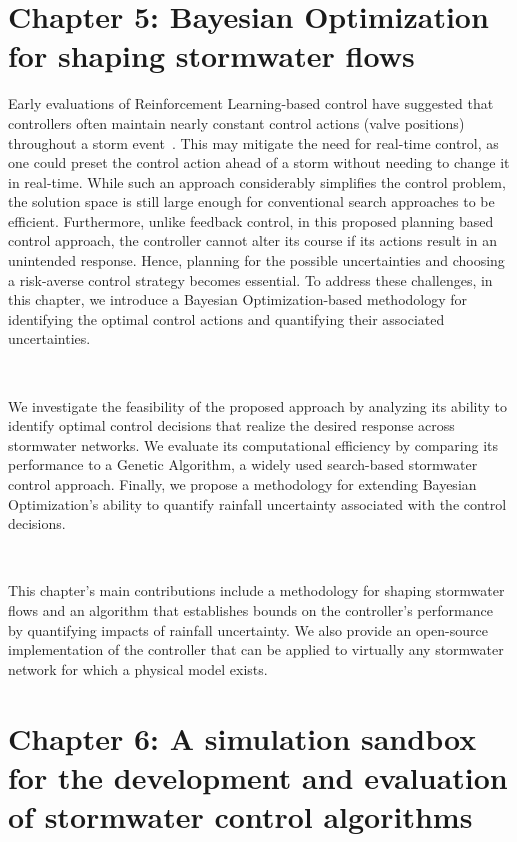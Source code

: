 \section{Chapter 5: Bayesian Optimization for shaping stormwater flows}

Early evaluations of Reinforcement Learning-based control have suggested that controllers often maintain nearly constant control actions (valve positions) throughout a storm event~\cite{Mullapudi_Lewis_Gruden_Kerkez_2020}.
This may mitigate the need for real-time control, as one could preset the control action ahead of a storm without needing to change it in real-time. 
While such an approach considerably simplifies the control problem, the solution space is still large enough for conventional search approaches to be efficient.
Furthermore, unlike feedback control, in this proposed planning based control approach, the controller cannot alter its course if its actions result in an unintended response. 
Hence, planning for the possible uncertainties and choosing a risk-averse control strategy becomes essential.
To address these challenges, in this chapter, we introduce a Bayesian Optimization-based methodology for identifying the optimal control actions and quantifying their associated uncertainties.

\

We investigate the feasibility of the proposed approach by analyzing its ability to identify optimal control decisions that realize the desired response across stormwater networks.
We evaluate its computational efficiency by comparing its performance to a Genetic Algorithm, a widely used search-based stormwater control approach.
Finally, we propose a methodology for extending Bayesian Optimization's ability to quantify rainfall uncertainty associated with the control decisions.

\

This chapter's main contributions include a methodology for shaping stormwater flows and an algorithm that establishes bounds on the controller's performance by quantifying impacts of rainfall uncertainty.
We also provide an open-source implementation of the controller that can be applied to virtually any stormwater network for which a physical model exists.

\section[Chapter 6: \texttt{pystorms}]{Chapter 6: A simulation sandbox for the development and evaluation of stormwater control algorithms}

